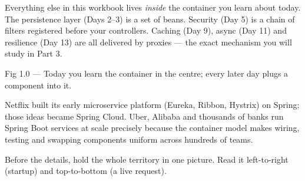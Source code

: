  Everything else in this workbook lives \emph{inside} the container you learn about today. The persistence layer (Days 2--3) is a set of beans. Security (Day 5) is a chain of filters registered before your controllers. Caching (Day 9), async (Day 11) and resilience (Day 13) are all delivered by proxies — the exact mechanism you will study in Part 3.

\begin{wbfigure}{Fig 1.0 — Today you learn the container in the centre; every later day plugs a component into it.}
\end{wbfigure}

 Netflix built its early microservice platform (Eureka, Ribbon, Hystrix) on Spring; those ideas became Spring Cloud. Uber, Alibaba and thousands of banks run Spring Boot services at scale precisely because the container model makes wiring, testing and swapping components uniform across hundreds of teams.


Before the details, hold the whole territory in one picture. Read it left-to-right (startup) and top-to-bottom (a live request).

